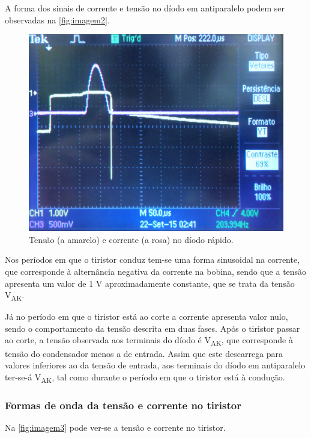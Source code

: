 \documentclass[a4paper,11pt]{article}
\numberwithin{equation}{section}
\begin{document}
A forma dos sinais de corrente e tensão no díodo em antiparalelo podem ser observadas na \autoref{fig:imagem2}.

\begin{figure}[h]
	\centering
	\includegraphics[keepaspectratio=true, scale=0.15]{img/imagem2}
	\caption{Tensão (a amarelo) e corrente (a rosa) no díodo rápido.}
	\label{fig:imagem2}
	\vspace{-0.8em}
\end{figure}

Nos períodos em que o tiristor conduz tem-se uma forma sinusoidal na corrente, que corresponde à alternância negativa da corrente na bobina, sendo que a tensão apresenta um valor de $1$ V aproximadamente constante, que se trata da tensão V\textsubscript{AK}. 

Já no período em que o tiristor está ao corte a corrente apresenta valor nulo, sendo o comportamento da tensão descrita em duas fases. Após o tiristor passar ao corte, a tensão observada aos terminais do díodo é V\textsubscript{AK}, que corresponde à tensão do condensador menos a de entrada. Assim que este descarrega para valores inferiores ao da tensão de entrada, aos terminais do díodo em antiparalelo ter-se-á V\textsubscript{AK}, tal como durante o período em que o tiristor está à condução.

\subsubsection{Formas de onda da tensão e corrente no tiristor}

Na \autoref{fig:imagem3} pode ver-se a tensão e corrente no tiristor.
\end{document}
